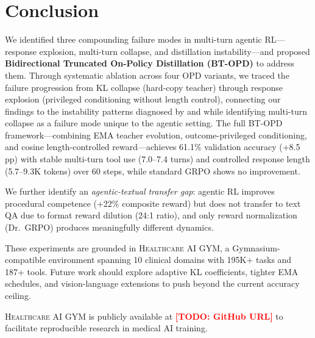 \documentclass{article}
\newcommand{\gym}{\textsc{Healthcare AI GYM}}
\newcommand{\todo}[1]{\textcolor{red}{\textbf{[TODO: #1]}}}
\begin{document}
\section{Conclusion}
\label{sec:conclusion}

We identified three compounding failure modes in multi-turn agentic RL---response explosion, multi-turn collapse, and distillation instability---and proposed \textbf{Bidirectional Truncated On-Policy Distillation (BT-OPD)} to address them. Through systematic ablation across four OPD variants, we traced the failure progression from KL collapse (hard-copy teacher) through response explosion (privileged conditioning without length control), connecting our findings to the instability patterns diagnosed by \citet{yang26rlsd} and \citet{zhao26opsd} while identifying multi-turn collapse as a failure mode unique to the agentic setting. The full BT-OPD framework---combining EMA teacher evolution, outcome-privileged conditioning, and cosine length-controlled reward---achieves 61.1\% validation accuracy (+8.5 pp) with stable multi-turn tool use (7.0--7.4 turns) and controlled response length (5.7--9.3K tokens) over 60 steps, while standard GRPO shows no improvement.

We further identify an \emph{agentic-textual transfer gap}: agentic RL improves procedural competence (+22\% composite reward) but does not transfer to text QA due to format reward dilution (24:1 ratio), and only reward normalization (Dr.~GRPO) produces meaningfully different dynamics.

These experiments are grounded in \gym{}, a Gymnasium-compatible environment spanning 10 clinical domains with 195K+ tasks and 187+ tools. Future work should explore adaptive KL coefficients, tighter EMA schedules, and vision-language extensions to push beyond the current accuracy ceiling.

\gym{} is publicly available at \todo{GitHub URL} to facilitate reproducible research in medical AI training.



\end{document}
